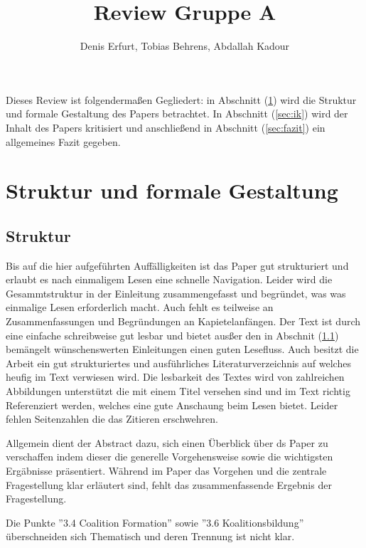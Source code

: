 \documentclass[sigconf]{acmart}
\theoremstyle{break}
\begin{document}
\title{Review Gruppe A}
\author{Denis Erfurt, Tobias Behrens, Abdallah Kadour}
\maketitle

Dieses Review ist folgendermaßen Gegliedert: in Abschnitt (\ref{sec:sfg}) wird die Struktur und formale Gestaltung des Papers betrachtet. In Abschnitt (\ref{sec:ik}) wird der Inhalt des Papers kritisiert und anschließend in Abschnitt (\ref{sec:fazit}) ein allgemeines Fazit gegeben.

\section{Struktur und formale Gestaltung}
\label{sec:sfg}

\subsection{Struktur}
\label{strukt}
Bis auf die hier aufgeführten Auffälligkeiten ist das Paper gut strukturiert und erlaubt es nach einmaligem Lesen eine schnelle Navigation. Leider wird die Gesammtstruktur in der Einleitung zusammengefasst und begründet, was was einmalige Lesen erforderlich macht. Auch fehlt es teilweise an Zusammenfassungen und Begründungen an Kapietelanfängen.
Der Text ist durch eine einfache schreibweise gut lesbar und bietet ausßer den in Abschnit (\ref{strukt}) bemängelt wünschenswerten Einleitungen einen guten Lesefluss. Auch besitzt die Arbeit ein gut strukturiertes und ausführliches Literaturverzeichnis auf welches heufig im Text verwiesen wird. Die lesbarkeit des Textes wird von zahlreichen Abbildungen unterstützt die mit einem Titel versehen sind und im Text richtig Referenziert werden, welches eine gute Anschaung beim Lesen bietet.
Leider fehlen Seitenzahlen die das Zitieren erschwehren.

Allgemein dient der Abstract dazu, sich einen Überblick über ds Paper zu verschaffen indem dieser die generelle Vorgehensweise
sowie die wichtigsten Ergäbnisse präsentiert. Während im Paper das Vorgehen und die zentrale Fragestellung klar erläutert sind, fehlt das zusammenfassende Ergebnis der Fragestellung.

Die Punkte ''3.4 Coalition Formation'' sowie ''3.6 Koalitionsbildung'' überschneiden sich Thematisch und deren Trennung ist nicht klar.
\end{document}
